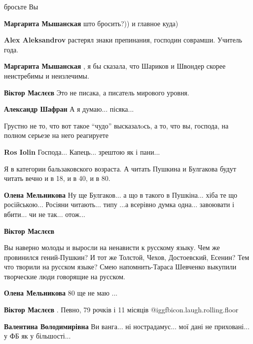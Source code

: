 \begin{itemize}
\begin{itemize}
\begin{itemize}
бросьте Вы

\textbf{Маргарита Мышанская} што бросить?)) и главное куда)

\textbf{Alex Aleksandrov} растерял знаки препинания, господин соврамши. Учитель года.

\textbf{Маргарита Мышанская} , я бы сказала, что Шариков и Швондер скорее неистребимы и неизлечимы.
\end{itemize} %

\textbf{Віктор Маслєєв} Это не писака, а писатель мирового уровня.

\begin{itemize} %
\textbf{Александр Шафран}
А я думаю... пісяка...
\end{itemize} %


Грустно не то, что вот такое \enquote{чудо} высказалoсь, а то, что вы, господа,
на полном серьезе на него реагируете


\textbf{Ros Iolin}
Господа...
Капець... зрештою як і пани...


Я в категории бальзаковского возраста. А читать Пушкина и Булгакова будут читать
вечно и в 18, и в 40, и в 80.

\begin{itemize} %
\textbf{Олена Мельникова}
Ну ще Булгаков... а що в такого в Пушкіна... хіба те що російською...
Росіяни читають... типу ...а всерівно думка одна... завоювати і вбити... чи не так... отож...

\textbf{Віктор Маслєєв} 

Вы наверно молоды и выросли на ненависти к русскому языку. Чем же провинился
гений-Пушкин? И тот же Толстой, Чехов, Достоевский, Есенин? Тем что творили на
русском языке? Смею напомнить-Тараса Шевченко выкупили творческие люди говорящие
на русском.

\textbf{Олена Мельникова}
80 ще не маю ...

\textbf{Віктор Маслєєв} . Певно, 79 рочків і 11 місяців @igg{fbicon.laugh.rolling.floor} 

\textbf{Валентина Володимирівна}
Ви ванга... ні нострадамус... мої дані не приховані... у ФБ як у більшості...
\end{itemize} %


\end{itemize}
\end{itemize}
